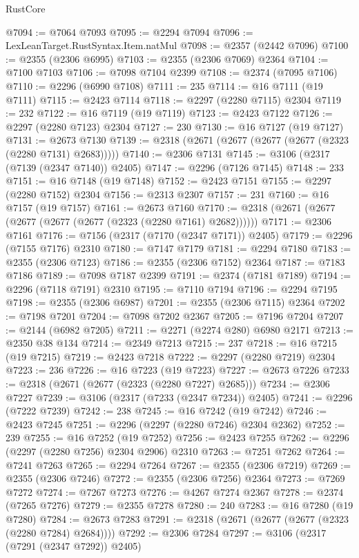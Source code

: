 \begin{lexlean}{RustCore}
\begin{coremodule}
@7094 := @7064 @7093
@7095 := @2294 @7094
@7096 := LexLeanTarget.RustSyntax.Item.natMul
@7098 := @2357 (@2442 @7096)
@7100 := @2355 (@2306 @6995)
@7103 := @2355 (@2306 @7069) @2364
@7104 := @7100 @7103
@7106 := @7098 @7104 @2399
@7108 := @2374 (@7095 @7106)
@7110 := @2296 (@6990 @7108)
@7111 := 235
@7114 := @16 @7111 (@19 @7111)
@7115 := @2423 @7114
@7118 := @2297 (@2280 @7115) @2304
@7119 := 232
@7122 := @16 @7119 (@19 @7119)
@7123 := @2423 @7122
@7126 := @2297 (@2280 @7123) @2304
@7127 := 230
@7130 := @16 @7127 (@19 @7127)
@7131 := @2673 @7130
@7139 := @2318 (@2671 (@2677 (@2677 (@2677 (@2323 (@2280 @7131) @2683)))))
@7140 := @2306 @7131
@7145 := @3106 (@2317 (@7139 (@2347 @7140)) @2405)
@7147 := @2296 (@7126 @7145)
@7148 := 233
@7151 := @16 @7148 (@19 @7148)
@7152 := @2423 @7151
@7155 := @2297 (@2280 @7152) @2304
@7156 := @2313 @2307
@7157 := 231
@7160 := @16 @7157 (@19 @7157)
@7161 := @2673 @7160
@7170 := @2318 (@2671 (@2677 (@2677 (@2677 (@2677 (@2323 (@2280 @7161) @2682))))))
@7171 := @2306 @7161
@7176 := @7156 (@2317 (@7170 (@2347 @7171)) @2405)
@7179 := @2296 (@7155 @7176) @2310
@7180 := @7147 @7179
@7181 := @2294 @7180
@7183 := @2355 (@2306 @7123)
@7186 := @2355 (@2306 @7152) @2364
@7187 := @7183 @7186
@7189 := @7098 @7187 @2399
@7191 := @2374 (@7181 @7189)
@7194 := @2296 (@7118 @7191) @2310
@7195 := @7110 @7194
@7196 := @2294 @7195
@7198 := @2355 (@2306 @6987)
@7201 := @2355 (@2306 @7115) @2364
@7202 := @7198 @7201
@7204 := @7098 @7202 @2367
@7205 := @7196 @7204
@7207 := @2144 (@6982 @7205)
@7211 := @2271 (@2274 @280) @6980 @2171
@7213 := @2350 @38 @134
@7214 := @2349 @7213
@7215 := 237
@7218 := @16 @7215 (@19 @7215)
@7219 := @2423 @7218
@7222 := @2297 (@2280 @7219) @2304
@7223 := 236
@7226 := @16 @7223 (@19 @7223)
@7227 := @2673 @7226
@7233 := @2318 (@2671 (@2677 (@2323 (@2280 @7227) @2685)))
@7234 := @2306 @7227
@7239 := @3106 (@2317 (@7233 (@2347 @7234)) @2405)
@7241 := @2296 (@7222 @7239)
@7242 := 238
@7245 := @16 @7242 (@19 @7242)
@7246 := @2423 @7245
@7251 := @2296 (@2297 (@2280 @7246) @2304 @2362)
@7252 := 239
@7255 := @16 @7252 (@19 @7252)
@7256 := @2423 @7255
@7262 := @2296 (@2297 (@2280 @7256) @2304 @2906) @2310
@7263 := @7251 @7262
@7264 := @7241 @7263
@7265 := @2294 @7264
@7267 := @2355 (@2306 @7219)
@7269 := @2355 (@2306 @7246)
@7272 := @2355 (@2306 @7256) @2364
@7273 := @7269 @7272
@7274 := @7267 @7273
@7276 := @4267 @7274 @2367
@7278 := @2374 (@7265 @7276)
@7279 := @2355 @7278
@7280 := 240
@7283 := @16 @7280 (@19 @7280)
@7284 := @2673 @7283
@7291 := @2318 (@2671 (@2677 (@2677 (@2323 (@2280 @7284) @2684))))
@7292 := @2306 @7284
@7297 := @3106 (@2317 (@7291 (@2347 @7292)) @2405)

\end{coremodule}
\end{lexlean}
